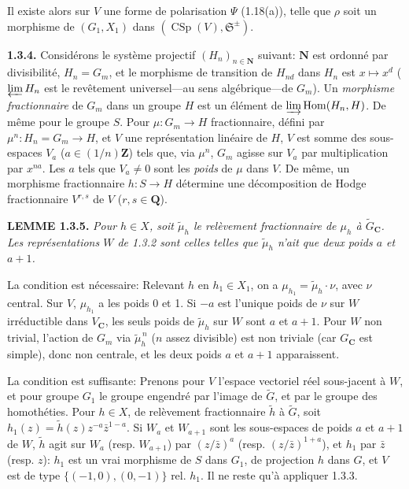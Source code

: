\documentclass[10pt,a4paper]{article}
\begin{document}
Il existe alors sur \(V\) une forme de polarisation \(\Psi\) (1.18(a)), telle que \(\rho\) soit un morphisme de \((G_1,X_1)\) dans \((\operatorname{CSp}(V),\mathfrak S^{\pm})\).

\textbf{1.3.4.} Considérons le système projectif \((H_n)_{n\in\mathbf N}\) suivant: \(\mathbf N\) est ordonné par divisibilité, \(H_n=G_m\), et le morphisme de transition de \(H_{nd}\) dans \(H_n\) est \(x\mapsto x^d\) (\(\varprojlim H_n\) est le revêtement universel---au sens algébrique---de \(G_m\)). Un \emph{morphisme fractionnaire} de \(G_m\) dans un groupe \(H\) est un élément de \(\varinjlim\operatorname{Hom}(H_n,H)\). De même pour le groupe \(S\). Pour \(\mu:G_m\to H\) fractionnaire, défini par \(\mu^n:H_n=G_m\to H\), et \(V\) une représentation linéaire de \(H\), \(V\) est somme des sous-espaces \(V_a\) (\(a\in(1/n)\mathbf Z\)) tels que, via \(\mu^n\), \(G_m\) agisse sur \(V_a\) par multiplication par \(x^{na}\). Les \(a\) tels que \(V_a\ne0\) sont les \emph{poids} de \(\mu\) dans \(V\). De même, un morphisme fractionnaire \(h:S\to H\) détermine une décomposition de Hodge fractionnaire \(V^{r,s}\) de \(V\) (\(r,s\in\mathbf Q\)).

\textbf{LEMME 1.3.5.} \emph{Pour \(h\in X\), soit \(\widetilde\mu_h\) le relèvement fractionnaire de \(\mu_h\) à \(\widetilde G_{\mathbf C}\). Les représentations \(W\) de 1.3.2 sont celles telles que \(\widetilde\mu_h\) n'ait que deux poids \(a\) et \(a+1\).}

La condition est nécessaire: Relevant \(h\) en \(h_1\in X_1\), on a \(\mu_{h_1}=\widetilde\mu_h\cdot\nu\), avec \(\nu\) central. Sur \(V\), \(\mu_{h_1}\) a les poids 0 et 1. Si \(-a\) est l'unique poids de \(\nu\) sur \(W\) irréductible dans \(V_{\mathbf C}\), les seuls poids de \(\widetilde\mu_h\) sur \(W\) sont \(a\) et \(a+1\). Pour \(W\) non trivial, l'action de \(G_m\) via \(\widetilde\mu_h^{\,n}\) (\(n\) assez divisible) est non triviale (car \(G_{\mathbf C}\) est simple), donc non centrale, et les deux poids \(a\) et \(a+1\) apparaissent.

La condition est suffisante: Prenons pour \(V\) l'espace vectoriel réel sous-jacent à \(W\), et pour groupe \(G_1\) le groupe engendré par l'image de \(\widetilde G\), et par le groupe des homothéties. Pour \(h\in X\), de relèvement fractionnaire \(\widetilde h\) à \(\widetilde G\), soit \(h_1(z)=\widetilde h(z)z^{-a}\bar z^{1-a}\). Si \(W_a\) et \(W_{a+1}\) sont les sous-espaces de poids \(a\) et \(a+1\) de \(W\), \(\widetilde h\) agit sur \(W_a\) (resp. \(W_{a+1}\)) par \((z/\bar z)^a\) (resp. \((z/\bar z)^{1+a}\)), et \(h_1\) par \(\bar z\) (resp. \(z\)): \(h_1\) est un vrai morphisme de \(S\) dans \(G_1\), de projection \(h\) dans \(G\), et \(V\) est de type \(\{(-1,0),(0,-1)\}\) rel. \(h_1\). Il ne reste qu'à appliquer 1.3.3.
\end{document}
